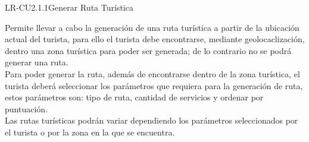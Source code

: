 
% 



	\begin{UseCase}{LR-CU2.1.1}{Generar Ruta Turística}{
		
		Permite llevar a cabo la generación de una ruta turística a partir de la ubicación actual del turista, para ello el turista debe encontrarse, mediante geolocaclización, dentro una zona turística para poder ser generada; de lo contrario no se podrá generar una ruta.\\
		
		Para poder generar la ruta, además de encontrarse dentro de la zona turística, el turista deberá seleccionar los parámetros que requiera para la generación de ruta, estos parámetros son: tipo de ruta, cantidad de servicios y ordenar por puntuación.\\
		
		Las rutas turísticas podrán variar dependiendo los parámetros seleccionados por el turista o por la zona en la que se encuentra.
	}
	\end{UseCase}
